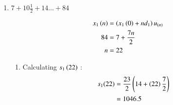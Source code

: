 \documentclass[journal,12pt,onecolumn]{IEEEtran}
\theoremstyle{remark}
\begin{document}
\begin{enumerate}[\brak{i}]
\item
$ 7 + 10\frac{1}{2} + 14 ... + 84$
\vspace{0.5cm}

\begin{align}
x_1\left(n\right) &= \left(x_1\left(0\right) + nd_1\right)u_{\left(n\right)}\\
84 &= 7+\frac{7n}{2}\\
n &= 22
\end{align}

\begin{enumerate}[1.]
\item 
Calculating $s_1\left(22\right)$ : 
\begin{align}
    s_1{\left(22\right)} &= \frac{23}{2}\left(14+\left(22\right)\frac{7}{2}\right)\\
     &= 1046.5
    \end{align}
    

\end{enumerate}
\end{enumerate}
\end{document}

